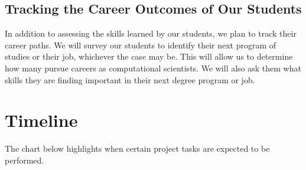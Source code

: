 \documentclass[11pt]{NSFamsart}
\begin{document}
\subsection{Tracking the Career Outcomes of Our Students} In addition to assessing the skills learned by our students, we plan to track their career paths.  We will survey our students to identify their next program of studies or their job, whichever the case may be. This will allow us to determine how many pursue careers as computational scientists. We will also ask them what skills they are finding important in their next degree program or job.


\section{Timeline}
The chart below highlights when certain project tasks are expected to be performed.

\bigskip
\end{document}

